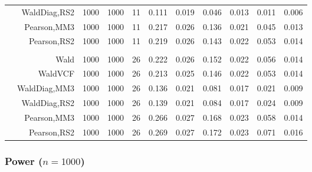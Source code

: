 \documentclass[
]{article}
\begin{document}
\begin{table}[H]
{\begin{tabular}[t]{lrrrrrrrlrr}
\hspace{1em} & WaldDiag,RS2 & 1000 & 1000 & 11 & 0.111 & 0.019 & 0.046 & 0.013 & 0.011 & 0.006\\

\hspace{1em} & Pearson,MM3 & 1000 & 1000 & 11 & 0.217 & 0.026 & 0.136 & 0.021 & 0.045 & 0.013\\

\hspace{1em} & Pearson,RS2 & 1000 & 1000 & 11 & 0.219 & 0.026 & 0.143 & 0.022 & 0.053 & 0.014\\
\cmidrule{1-11}
\addlinespace[0.3em]
\multicolumn{11}{l}{\textbf{3F 15V}}\\
\hspace{1em} & Wald & 1000 & 1000 & 26 & 0.222 & 0.026 & 0.152 & 0.022 & 0.056 & 0.014\\

\hspace{1em} & WaldVCF & 1000 & 1000 & 26 & 0.213 & 0.025 & 0.146 & 0.022 & 0.053 & 0.014\\

\hspace{1em} & WaldDiag,MM3 & 1000 & 1000 & 26 & 0.136 & 0.021 & 0.081 & 0.017 & 0.021 & 0.009\\

\hspace{1em} & WaldDiag,RS2 & 1000 & 1000 & 26 & 0.139 & 0.021 & 0.084 & 0.017 & 0.024 & 0.009\\

\hspace{1em} & Pearson,MM3 & 1000 & 1000 & 26 & 0.266 & 0.027 & 0.168 & 0.023 & 0.058 & 0.014\\

\hspace{1em} & Pearson,RS2 & 1000 & 1000 & 26 & 0.269 & 0.027 & 0.172 & 0.023 & 0.071 & 0.016\\
\bottomrule
\end{tabular}}
\endgroup{}
\end{table}

\hypertarget{power-n1000}{%
\subsubsection{\texorpdfstring{Power
(\(n=1000\))}{Power (n=1000)}}\label{power-n1000}}
\end{document}
